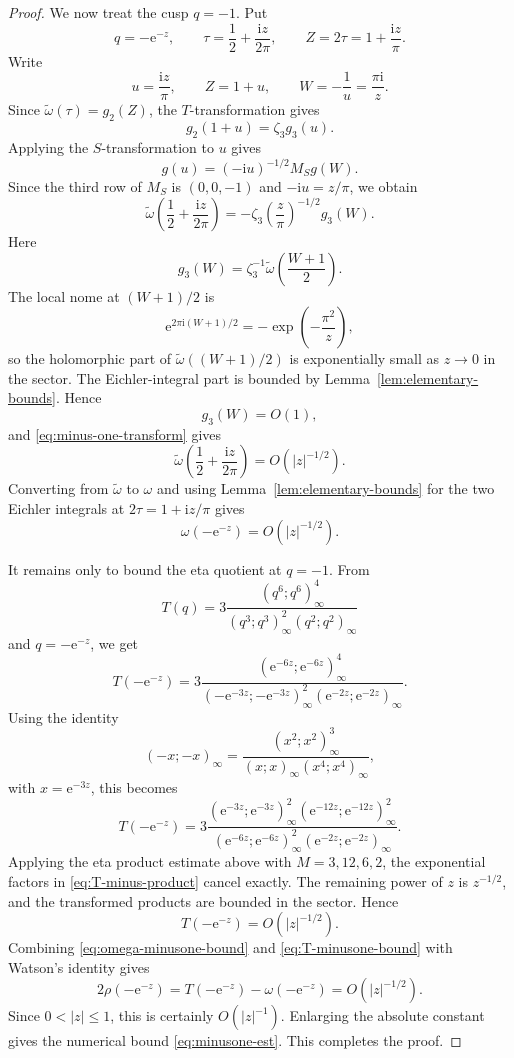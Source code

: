 \documentclass[11pt]{article}
\theoremstyle{remark}
\newcommand{\ii}{\mathrm i}
\newcommand{\e}{\mathrm e}
\begin{document}
\begin{proof}
We now treat the cusp $q=-1$.  Put
\[
q=-\e^{-z},\qquad \tau=\frac12+\frac{\ii z}{2\pi},\qquad Z=2\tau=1+\frac{\ii z}{\pi}.
\]
Write
\[
u=\frac{\ii z}{\pi},\qquad Z=1+u,
\qquad W=-\frac1u=\frac{\pi\ii}{z}.
\]
Since $\widetilde\omega(\tau)=g_2(Z)$, the $T$-transformation gives
\[
g_2(1+u)=\zeta_3 g_3(u).
\]
Applying the $S$-transformation to $u$ gives
\[
g(u)=(-\ii u)^{-1/2}M_Sg(W).
\]
Since the third row of $M_S$ is $(0,0,-1)$ and $-\ii u=z/\pi$, we obtain
\begin{equation}\label{eq:minus-one-transform}
\widetilde\omega\left(\frac12+\frac{\ii z}{2\pi}\right)
= -\zeta_3\left(\frac{z}{\pi}\right)^{-1/2}g_3(W).
\end{equation}
Here
\[
g_3(W)=\zeta_3^{-1}\widetilde\omega\left(\frac{W+1}{2}\right).
\]
The local nome at $(W+1)/2$ is
\[
\e^{2\pi\ii(W+1)/2}=-\exp\left(-\frac{\pi^2}{z}\right),
\]
so the holomorphic part of $\widetilde\omega((W+1)/2)$ is exponentially small as
$z\to0$ in the sector.  The Eichler-integral part is bounded by Lemma~\ref{lem:elementary-bounds}.  Hence
\[
g_3(W)=O(1),
\]
and \eqref{eq:minus-one-transform} gives
\[
\widetilde\omega\left(\frac12+\frac{\ii z}{2\pi}\right)=O(|z|^{-1/2}).
\]
Converting from $\widetilde\omega$ to $\omega$ and using Lemma~\ref{lem:elementary-bounds} for the two Eichler integrals at $2\tau=1+\ii z/\pi$ gives
\begin{equation}\label{eq:omega-minusone-bound}
\omega(-\e^{-z})=O(|z|^{-1/2}).
\end{equation}

It remains only to bound the eta quotient at $q=-1$.  From
\[
T(q)=3\frac{(q^6;q^6)_\infty^4}{(q^3;q^3)_\infty^2(q^2;q^2)_\infty}
\]
and $q=-\e^{-z}$, we get
\[
T(-\e^{-z})
=3\frac{(\e^{-6z};\e^{-6z})_\infty^4}{(-\e^{-3z};-\e^{-3z})_\infty^2(\e^{-2z};\e^{-2z})_\infty}.
\]
Using the identity
\[
(-x;-x)_\infty=
\frac{(x^2;x^2)_\infty^3}{(x;x)_\infty(x^4;x^4)_\infty},
\]
with $x=\e^{-3z}$, this becomes
\begin{equation}\label{eq:T-minus-product}
T(-\e^{-z})
=
3\frac{(\e^{-3z};\e^{-3z})_\infty^2(\e^{-12z};\e^{-12z})_\infty^2}{(\e^{-6z};\e^{-6z})_\infty^2(\e^{-2z};\e^{-2z})_\infty}.
\end{equation}
Applying the eta product estimate above with $M=3,12,6,2$, the exponential factors in
\eqref{eq:T-minus-product} cancel exactly.  The remaining power of $z$ is $z^{-1/2}$, and the transformed products are bounded in the sector.  Hence
\begin{equation}\label{eq:T-minusone-bound}
T(-\e^{-z})=O(|z|^{-1/2}).
\end{equation}
Combining \eqref{eq:omega-minusone-bound} and \eqref{eq:T-minusone-bound} with Watson's identity gives
\[
2\rho(-\e^{-z})=T(-\e^{-z})-\omega(-\e^{-z})=O(|z|^{-1/2}).
\]
Since $0<|z|\leq1$, this is certainly $O(|z|^{-1})$.  Enlarging the absolute constant gives the numerical bound \eqref{eq:minusone-est}.  This completes the proof.
\end{proof}
\end{document}
